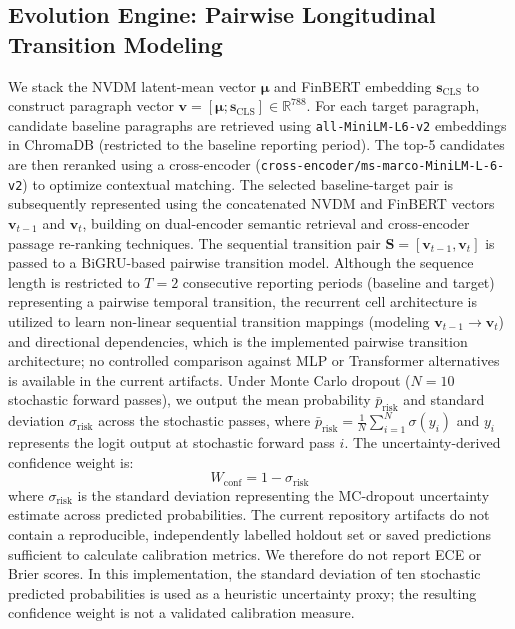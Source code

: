 \documentclass[pdflatex,sn-basic,Numbered]{sn-jnl}
\begin{document}
\subsection{Evolution Engine: Pairwise Longitudinal Transition Modeling}
We stack the NVDM latent-mean vector $\boldsymbol{\mu}$ and FinBERT embedding $\mathbf{s}_{\text{CLS}}$ to construct paragraph vector $\mathbf{v} = [\boldsymbol{\mu}; \mathbf{s}_{\text{CLS}}] \in \mathbb{R}^{788}$. For each target paragraph, candidate baseline paragraphs are retrieved using \texttt{all-MiniLM-L6-v2} embeddings in ChromaDB (restricted to the baseline reporting period). The top-5 candidates are then reranked using a cross-encoder (\texttt{cross-encoder/}\allowbreak\texttt{ms-marco-MiniLM-L-6-v2}) to optimize contextual matching. The selected baseline-target pair is subsequently represented using the concatenated NVDM and FinBERT vectors $\mathbf{v}_{t-1}$ and $\mathbf{v}_t$, building on dual-encoder semantic retrieval \cite{reimers2019} and cross-encoder passage re-ranking \cite{nogueira2019} techniques. The sequential transition pair $\mathbf{S} = [\mathbf{v}_{t-1}, \mathbf{v}_t]$ is passed to a BiGRU-based pairwise transition model. Although the sequence length is restricted to $T=2$ consecutive reporting periods (baseline and target) representing a pairwise temporal transition, the recurrent cell architecture is utilized to learn non-linear sequential transition mappings (modeling $\mathbf{v}_{t-1} \rightarrow \mathbf{v}_t$) and directional dependencies, which is the implemented pairwise transition architecture; no controlled comparison against MLP or Transformer alternatives is available in the current artifacts. Under Monte Carlo dropout \cite{gal2016} ($N=10$ stochastic forward passes), we output the mean probability $\bar{p}_{\text{risk}}$ and standard deviation $\sigma_{\text{risk}}$ across the stochastic passes, where $\bar{p}_{\text{risk}} = \frac{1}{N} \sum_{i=1}^{N} \sigma(y_i)$ and $y_i$ represents the logit output at stochastic forward pass $i$. The uncertainty-derived confidence weight is:
\begin{equation}
W_{\text{conf}} = 1 - \sigma_{\text{risk}}
\end{equation}
where $\sigma_{\text{risk}}$ is the standard deviation representing the MC-dropout uncertainty estimate across predicted probabilities. The current repository artifacts do not contain a reproducible, independently labelled holdout set or saved predictions sufficient to calculate calibration metrics. We therefore do not report ECE or Brier scores. In this implementation, the standard deviation of ten stochastic predicted probabilities is used as a heuristic uncertainty proxy; the resulting confidence weight is not a validated calibration measure.
\end{document}
